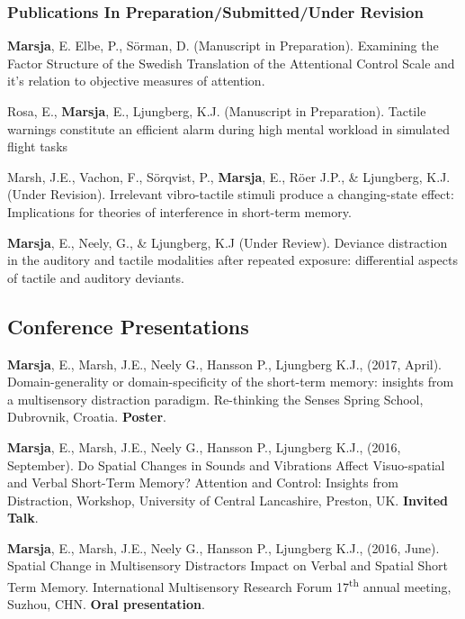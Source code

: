 \documentclass[]{article}
\begin{document}
\subsubsection{Publications In Preparation/Submitted/Under
Revision}\label{publications-in-preparationsubmittedunder-revision}

\textbf{Marsja}, E. Elbe, P., Sörman, D. (Manuscript in Preparation).
Examining the Factor Structure of the Swedish Translation of the
Attentional Control Scale and it's relation to objective measures of
attention.

Rosa, E., \textbf{Marsja}, E., Ljungberg, K.J. (Manuscript in
Preparation). Tactile warnings constitute an efficient alarm during high
mental workload in simulated flight tasks

Marsh, J.E., Vachon, F., Sörqvist, P., \textbf{Marsja}, E., Röer J.P.,
\& Ljungberg, K.J. (Under Revision). Irrelevant vibro-tactile stimuli
produce a changing-state effect: Implications for theories of
interference in short-term memory.

\textbf{Marsja}, E., Neely, G., \& Ljungberg, K.J (Under Review).
Deviance distraction in the auditory and tactile modalities after
repeated exposure: differential aspects of tactile and auditory
deviants.

\subsection{Conference Presentations}\label{conference-presentations}

\textbf{Marsja}, E., Marsh, J.E., Neely G., Hansson P., Ljungberg K.J.,
(2017, April). Domain-generality or domain-specificity of the short-term
memory: insights from a multisensory distraction paradigm. Re-thinking
the Senses Spring School, Dubrovnik, Croatia. \textbf{Poster}.

\textbf{Marsja}, E., Marsh, J.E., Neely G., Hansson P., Ljungberg K.J.,
(2016, September). Do Spatial Changes in Sounds and Vibrations Affect
Visuo-spatial and Verbal Short-Term Memory? Attention and Control:
Insights from Distraction, Workshop, University of Central Lancashire,
Preston, UK. \textbf{Invited Talk}.

\textbf{Marsja}, E., Marsh, J.E., Neely G., Hansson P., Ljungberg K.J.,
(2016, June). Spatial Change in Multisensory Distractors Impact on
Verbal and Spatial Short Term Memory. International Multisensory
Research Forum 17\textsuperscript{th} annual meeting, Suzhou, CHN.
\textbf{Oral presentation}.
\end{document}

